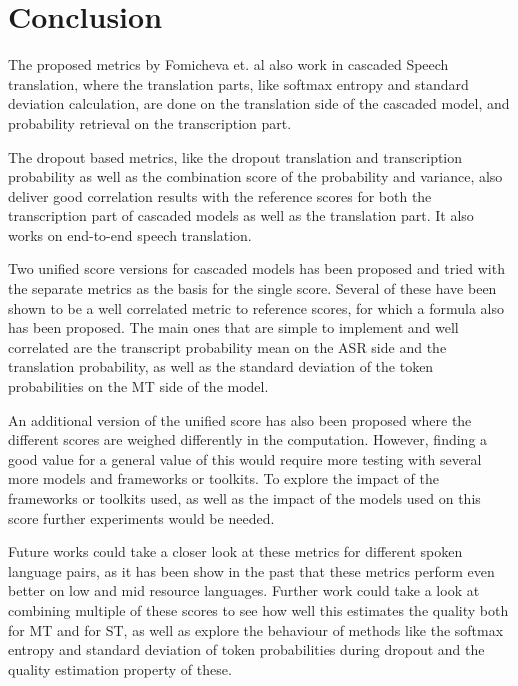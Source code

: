 
\chapter{Conclusion}
\label{ch:Conclusion}
The proposed metrics by Fomicheva et. al \cite{fomicheva2020unsupervised} also work in cascaded Speech translation, where the translation parts, like softmax entropy and standard deviation calculation, are done on the translation side of the cascaded model, and probability retrieval on the transcription part. 

The dropout based metrics, like the dropout translation and transcription probability as well as the combination score of the probability and variance,  also deliver good correlation results with the reference scores for both the transcription part of cascaded models as well as the translation part. It also works on end-to-end speech translation.

Two unified score versions for cascaded models has been proposed and tried with the separate metrics as the basis for the single score. Several of these have been shown to be a well correlated metric to reference scores, for which a formula also has been proposed. The main ones that are simple to implement and well correlated are the transcript probability mean on the ASR side and the translation probability, as well as the standard deviation of the token probabilities on the MT side of the model.

An additional version of the unified score has also been proposed where the different scores are weighed differently in the computation. However, finding a good value for a general value of this would require more testing with several more models and frameworks or toolkits. 
To explore the impact of the frameworks or toolkits used, as well as the impact of the models used on this score further experiments would be needed. 

Future works could take a closer look at these metrics for different spoken language pairs, as it has been show in the past that these metrics perform even better on low and mid resource languages. Further work could take a look at combining multiple of these scores to see how well this estimates the quality both for MT and for ST, as well as explore the behaviour of methods like the softmax entropy and standard deviation of token probabilities during dropout and the quality estimation property of these.